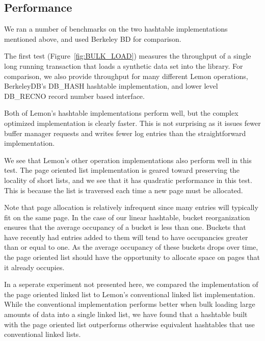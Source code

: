 \documentclass[letterpaper,twocolumn,english]{article}
\newcommand{\yad}{Lemon\xspace}
\begin{document}
\subsection{Performance}

We ran a number of benchmarks on the two hashtable implementations
mentioned above, and used Berkeley BD for comparison.


The first test (Figure~\ref{fig:BULK_LOAD}) measures the throughput of
a single long running
transaction that loads a synthetic data set into the
library.  For comparison, we also provide throughput for many different
\yad operations, BerkeleyDB's DB\_HASH hashtable implementation,
and lower level DB\_RECNO record number based interface.  

Both of \yad's hashtable implementations perform well, but the complex
optimized implementation is clearly faster.  This is not surprising as
it issues fewer buffer manager requests and writes fewer log entries
than the straightforward implementation.

We see that \yad's other operation implementations also perform well
in this test.  The page oriented list implementation is geared toward
preserving the locality of short lists, and we see that it has
quadratic performance in this test.  This is because the list is
traversed each time a new page must be allocated.  

Note that page allocation is relatively infrequent since many entries
will typically fit on the same page.  In the case of our linear
hashtable, bucket reorganization ensures that the average occupancy of
a bucket is less than one.  Buckets that have recently had entries
added to them will tend to have occupancies greater than or equal to
one.  As the average occupancy of these buckets drops over time, the
page oriented list should have the opportunity to allocate space on
pages that it already occupies.

In a seperate experiment not presented here, we compared the
implementation of the page oriented linked list to \yad's conventional
linked list implementation.  While the conventional implementation
performs better when bulk loading large amounts of data into a single
linked list, we have found that a hashtable built with the page oriented list
outperforms otherwise equivalent hashtables that use conventional linked lists.
\end{document}
